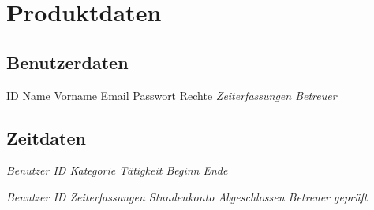 \section{Produktdaten}

\subsection{Benutzerdaten}
\begin{requirements}
	\begin{requirements}
		 ID
		 Name
		 Vorname
		 Email
		 Passwort
		 Rechte
		 \em Zeiterfassungen \em
		 \em Betreuer \em
	\end{requirements}
\end{requirements}

\subsection{Zeitdaten}
\begin{requirements}
	\req [Zeiterfassung] {D20}
	\begin{requirements}
		 \em Benutzer \em  ID
		 \em Kategorie \em
		 \em Tätigkeit \em
		 Beginn
		 Ende
	\end{requirements}

	\req [Stundenzettel] {D30}
	\begin{requirements}
		 \em Benutzer \em  ID
		 \em Zeiterfassungen \em
		 Stundenkonto
		 Abgeschlossen
		 \em Betreuer \em  geprüft
	\end{requirements}
\end{requirements}


